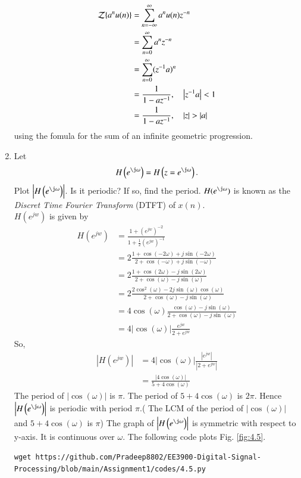 \documentclass[journal,12pt,twocolumn]{IEEEtran}
\renewcommand\thesection{\arabic{section}}
\begin{document}
\begin{enumerate}[label=\thesection.\arabic*]
\begin{equation}
\end{equation}
\solution
\begin{align}
	{\mathcal {Z}}\{a^nu(n)\}&=\sum _{n=-\infty }^{\infty }a^nu(n)z^{-n}\\
	&=\sum _{n=0 }^{\infty }a^nz^{-n}\\
	&=\sum _{n=0 }^{\infty }(z^{-1}a)^{n}\\
	&=\frac{1}{1-az^{-1}}, \quad \left\vert z^{-1}a\right\vert < 1\\
	&=\frac{1}{1-az^{-1}}, \quad \left\vert z\right\vert > \left\vert a\right\vert 
\end{align}
using the fomula for the sum of an infinite geometric progression.
%
\item 
Let
\begin{equation}
H\brak{e^{\j \omega}} = H\brak{z = e^{\j \omega}}.
\end{equation}
Plot $\abs{H\brak{e^{\j \omega}}}$.  Is it periodic? If so, find the period.  $H(e^{\j \omega})$ is
known as the {\em Discret Time Fourier Transform} (DTFT) of $x(n)$.
\\
\solution $H(e^{jw})$ is given by
\begin{align}
	H(e^{jw})&=\frac{1+(e^{jw})^{-2}}{1+\frac{1}{2}(e^{jw})^{-1}}\\
	&=2\frac{1+\cos(-2\omega)+j\sin(-2\omega)}{2+\cos(-\omega)+j\sin(-\omega)}\\
	&=2\frac{1+\cos(2\omega)-j\sin(2\omega)}{2+\cos(\omega)-j\sin(\omega)}\\
	&=2\frac{2\cos^2(\omega)-2j\sin(\omega)\cos(\omega)}{2+\cos(\omega)-j\sin(\omega)}\\
	&=4\cos(\omega)\frac{\cos(\omega)-j\sin(\omega)}{2+\cos(\omega)-j\sin(\omega)}\\
	&=4|\cos(\omega)| \frac{e^{jw}}{2+e^{jw}}
\end{align}
So,
\begin{align}
	|H(e^{jw})|&=4 |\cos(\omega)| \frac{|e^{jw}|}{|2+e^{jw}|}\\
	&=\frac{|4\cos(\omega)|}{5+4\cos(\omega)}
\end{align}
The period of $|\cos(\omega)|$ is $\pi$. The period of $5+4\cos(\omega)$ is $2\pi$. Hence $\abs{H\brak{e^{\j\omega}}}$ is periodic with period $\pi$.( The LCM of the period of $|\cos(\omega)|$ and $5+4\cos(\omega)$ is $\pi$)
The graph of $\abs{H\brak{e^{\j\omega}}}$ is symmetric with respect to y-axis. It is continuous over $\omega$. The following code plots Fig. \ref{fig:4.5}.
\begin{lstlisting}
wget https://github.com/Pradeep8802/EE3900-Digital-Signal-Processing/blob/main/Assignment1/codes/4.5.py

\end{lstlisting}
\end{enumerate}
\end{document}
